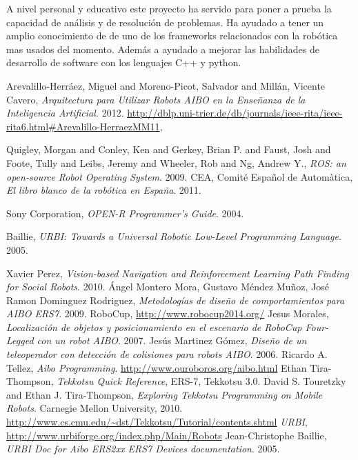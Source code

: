 \documentclass[12pt,a4paper,final,twoside]{article}
\begin{document}
A nivel personal y educativo este proyecto ha servido para poner a prueba la capacidad de análisis y de resolución de problemas. Ha ayudado a tener un amplio conocimiento de de uno de los frameworks relacionados con la robótica mas usados del momento. Además a ayudado a mejorar las habilidades de desarrollo de software con los lenguajes C++ y python. 




\newpage
\clearpage
{}
\begin{thebibliography}{99}
	Arevalillo-Herráez, Miguel and Moreno-Picot, Salvador and Millán, Vicente Cavero,
	\emph{Arquitectura para Utilizar Robots AIBO en la Enseñanza de la Inteligencia Artificial.}
	2012.
	\url{http://dblp.uni-trier.de/db/journals/ieee-rita/ieee-rita6.html#Arevalillo-HerraezMM11},
	
	Quigley, Morgan and Conley, Ken and Gerkey, Brian P. and Faust, Josh and Foote, Tully and Leibs, Jeremy and Wheeler, Rob and Ng, Andrew Y.,
	\emph{ROS: an open-source Robot Operating System}.
	2009.
	CEA, Comité Español de Automàtica,
	\emph{El libro blanco de la robótica en España}.
	2011.
	
  Sony Corporation,
  \emph{OPEN-R Programmer's Guide}.
  2004.

	Baillie,
	\emph{URBI: Towards a Universal Robotic Low-Level Programming Language}.
	2005.
	
	Xavier Perez,
	\emph{Vision-based Navigation and Reinforcement Learning Path Finding for Social Robots}.
	2010.
	Ángel Montero Mora, Gustavo Méndez Muñoz, José Ramon Dominguez Rodriguez,
	\emph{Metodologías de diseño de comportamientos para AIBO ERS7}.
	2009.
	RoboCup, \url{http://www.robocup2014.org/}
	Jesus Morales,
	\emph{Localización de objetos y posicionamiento en el escenario de RoboCup Four-Legged con un robot AIBO}.
	2007.  
	Jesús Martinez Gómez, 
	\emph{Diseño de un teleoperador con detección de colisiones para robots AIBO}. 			2006.
	Ricardo A. Tellez,
	\emph{Aibo Programming}.
	\url{http://www.ouroboros.org/aibo.html}
	Ethan Tira-Thompson,
	\emph{Tekkotsu Quick Reference}, ERS-7, Tekkotsu 3.0.
	David S. Touretzky and Ethan J. Tira-Thompson, 
	\emph{Exploring Tekkotsu Programming on Mobile Robots}.
	Carnegie Mellon University,
	2010.
	\url{http://www.cs.cmu.edu/~dst/Tekkotsu/Tutorial/contents.shtml}
	\emph{URBI},
	\url{http://www.urbiforge.org/index.php/Main/Robots}
	Jean-Christophe Baillie,
	\emph{URBI Doc for Aibo ERS2xx ERS7 Devices documentation}.
	2005.
	
\end{thebibliography}
\end{document}
